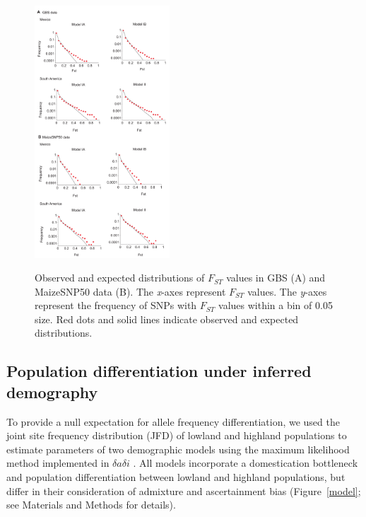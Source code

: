 \begin{figure}[tb]   
  \begin{center}
   \vspace{-0mm}
   \includegraphics[width=0.45\textwidth]{fig/Fig5}
   \renewcommand{\baselinestretch}{0.9}
   \vspace{-3mm}
   \caption{Observed and expected distributions of $F_{ST}$ values in GBS (A) and MaizeSNP50 data (B).  The \emph{x}-axes represent $F_{ST}$ values.  The \emph{y}-axes represent the frequency of SNPs with $F_{ST}$ values within a bin of 0.05 size.  Red dots and solid lines indicate observed and expected distributions. 
   }
\vspace{-6mm}
    \label{FstDist}
  \end{center}
\end{figure}

\subsection*{Population differentiation under inferred demography}

To provide a null expectation for allele frequency differentiation, we used the joint site frequency distribution (JFD) of lowland and highland populations to estimate parameters of two demographic models  using the maximum likelihood method implemented in $\delta a \delta i$ \cite[]{Gutenkunst_2009_19851460}.  
All models incorporate a domestication bottleneck \cite[]{Wright_2005_15919994} and population differentiation between lowland and highland populations, but differ in their consideration of admixture and ascertainment bias (Figure~\ref{model}; see Materials and Methods for details).

